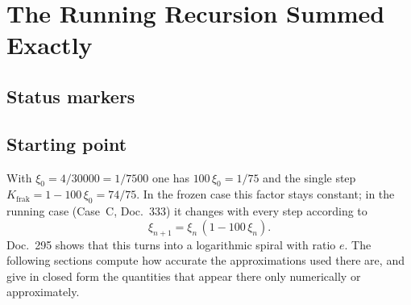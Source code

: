 
\providecommand{\BM}{\textbf{[B]}}
\providecommand{\KM}{\textbf{[K]}}
\providecommand{\SM}{\textbf{[S]}}

\chapter*{The Running Recursion Summed Exactly}

\begin{abstract}
The recursion $\xi_{n+1}=\xi_n(1-100\,\xi_n)$ (Doc.~295, 333) is the bookkeeping of
the fractal correction in the running case. Doc.~295 derives its continuum behaviour
$\xi_n\approx1/(100(n+75))$ and the logarithmic defect $D(n)\approx\ln(1+n/75)$.
This document adds four statements. First, the product of all correction factors
telescopes exactly to $\xi_n/\xi_0$ \BM. Second, a logarithmic second-order term
improves the continuum approximation by a factor of 50 to about 1000 \KM. Third, the
multiplicative and additive bookkeeping differ by a fixed amount $\psi'(75)/2$, and
the bounded constant $\approx0.0134$ between mass and time defect found numerically
in Doc.~295 is $\psi'(75)=\sum_{k\ge0}(k+75)^{-2}$ \KM. Fourth, the recursion has the
form of a one-loop running, whose coefficient, however, is fixed only together with
a step convention \SM.
\end{abstract}

\section*{Status markers}


\section{Starting point}

With $\xi_0=4/30000=1/7500$ one has $100\,\xi_0=1/75$ and the single step
$K_\text{frak}=1-100\,\xi_0=74/75$. In the frozen case this factor stays constant;
in the running case (Case~C, Doc.~333) it changes with every step according to
\begin{equation}
  \xi_{n+1}=\xi_n\,(1-100\,\xi_n). \label{eq:rek}
\end{equation}
Doc.~295 shows that this turns into a logarithmic spiral with ratio $e$. The
following sections compute how accurate the approximations used there are, and
give in closed form the quantities that appear there only numerically or
approximately.

